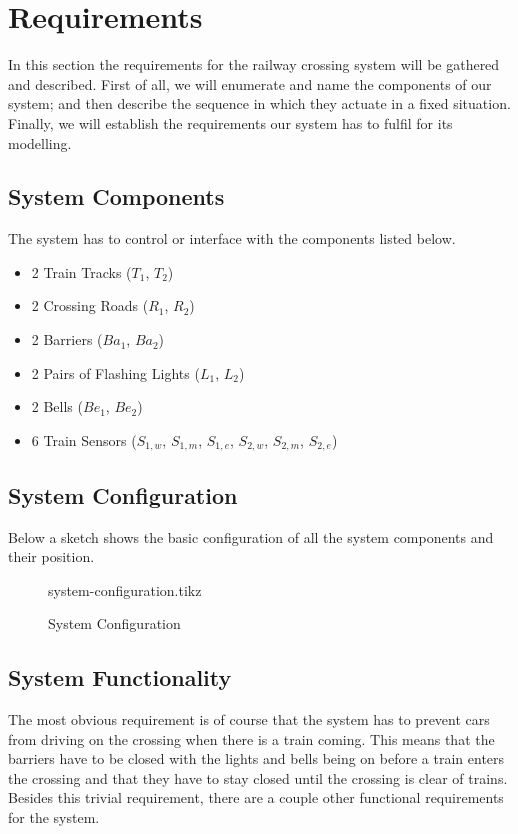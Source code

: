 \documentclass[final]{report}
\begin{document}
\chapter{Requirements}
In this section the requirements for the railway crossing system will be gathered and described.
First of all, we will enumerate and name the components of our system; and then describe the sequence in which they actuate in a fixed situation.
Finally, we will establish the requirements our system has to fulfil for its modelling.

\section{System Components}
The system has to control or interface with the components listed below.
\begin{itemize}
\item 2 Train Tracks ($T_{1}$, $T_{2}$)
\item 2 Crossing Roads ($R_{1}$, $R_{2}$)
\item 2 Barriers ($Ba_{1}$, $Ba_{2}$)
\item 2 Pairs of Flashing Lights ($L_{1}$, $L_{2}$)
\item 2 Bells ($Be_{1}$, $Be_{2}$)
\item 6 Train Sensors ($S_{1,w}$, $S_{1,m}$, $S_{1,e}$, $S_{2,w}$, $S_{2,m}$, $S_{2,e}$)
\end{itemize}

\section{System Configuration}
Below a sketch shows the basic configuration of all the system components and their position.
\begin{figure}[H]
	\centering
	{system-configuration.tikz}
	\caption{System Configuration}
	\label{fig:system-configuration}
\end{figure}

\section{System Functionality}\label{sec:requirements}
The most obvious requirement is of course that the system has to prevent cars from driving on the crossing when there is a train coming.
This means that the barriers have to be closed with the lights and bells being on before a train enters the crossing and that they have to stay closed until the crossing is clear of trains.
Besides this trivial requirement, there are a couple other functional requirements for the system.
\end{document}
